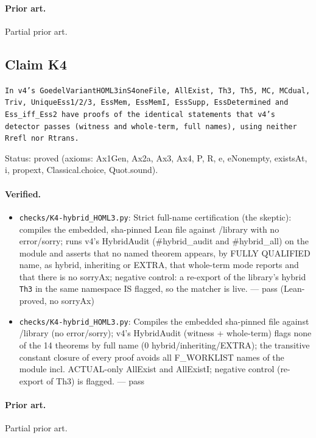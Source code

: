 \documentclass{article}
\begin{document}
\paragraph{Prior art.} Partial prior art.

\subsection*{Claim K4}

\texttt{In v4's GoedelVariantHOML3inS4oneFile, AllExist, Th3, Th5, MC, MCdual, Triv, UniqueEss1/2/3, EssMem, EssMemI, EssSupp, EssDetermined and Ess\_iff\_Ess2 have proofs of the identical statements that v4's detector passes (witness and whole-term, full names), using neither Rrefl nor Rtrans.}

Status: proved (axioms: Ax1Gen, Ax2a, Ax3, Ax4, P, R, e, eNonempty, existsAt, i, propext, Classical.choice, Quot.sound).

\paragraph{Verified.}
\begin{itemize}
\item \texttt{checks/K4-hybrid\_HOML3.py}: Strict full-name certification (the skeptic): compiles the embedded, sha-pinned Lean file against /library with no error/sorry; runs v4's HybridAudit (\#hybrid\_audit and \#hybrid\_all) on the module and asserts that no named theorem appears, by FULLY QUALIFIED name, as hybrid, inheriting or EXTRA, that whole-term mode reports and that there is no sorryAx; negative control: a re-export of the library's hybrid \texttt{Th3} in the same namespace IS flagged, so the matcher is live. --- pass (Lean-proved, no sorryAx)
\item \texttt{checks/K4-hybrid\_HOML3.py}: Compiles the embedded sha-pinned file against /library (no error/sorry); v4's HybridAudit (witness + whole-term) flags none of the 14 theorems by full name (0 hybrid/inheriting/EXTRA); the transitive constant closure of every proof avoids all F\_WORKLIST names of the module incl. ACTUAL-only AllExist and AllExistI; negative control (re-export of Th3) is flagged. --- pass
\end{itemize}

\paragraph{Prior art.} Partial prior art.
\end{document}
